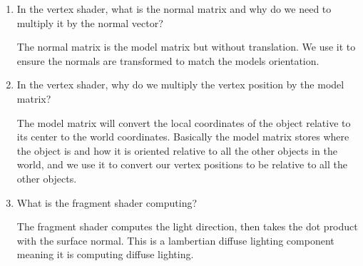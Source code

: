 \documentclass{article}
\begin{document}
\begin{enumerate}
            \begin{enumerate}
                \item In the vertex shader, what is the normal matrix and why do we need to multiply
                    it by the normal vector?
                    \begin{mdframed}
                        The normal matrix is the model matrix
                        but without translation. We use
                        it to ensure the normals are transformed
                        to match the models orientation.
                    \end{mdframed}

                \item In the vertex shader, why do we multiply the vertex position by the model
                    matrix?

                    \begin{mdframed}
                        The model matrix will convert the local coordinates
                        of the object relative to its center to the world
                        coordinates. Basically the model matrix stores where
                        the object is and how it is oriented relative to all the
                        other objects in the world, and we use it to convert
                        our vertex positions to be relative to all the other
                        objects.
                    \end{mdframed}

                \item What is the fragment shader computing?
                    \begin{mdframed}
                        The fragment shader computes the light direction,
                        then takes the dot product with the surface normal. This
                        is a lambertian diffuse lighting component meaning
                        it is computing diffuse lighting.
                    \end{mdframed}
            \end{enumerate}
    \end{enumerate}
\end{document}
